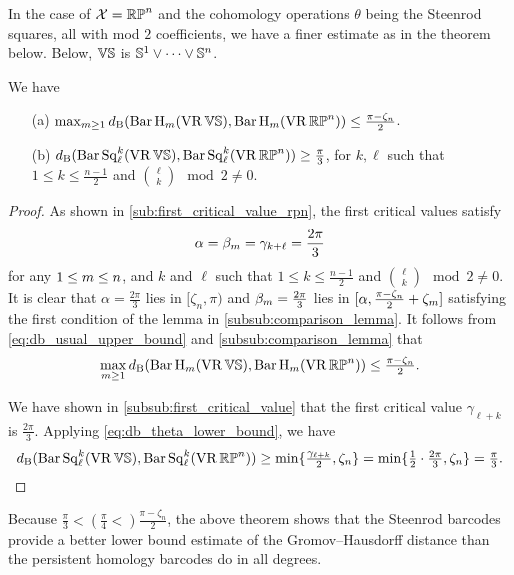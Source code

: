 \subsubsection{}

In the case of $\mathcal{X} = \mathbb{RP}^n$ and the cohomology operations $\theta$ being the Steenrod squares, all with mod $2$ coefficients, we have a finer estimate as in the theorem below.
Below, $\mathbb{V}\mathbb{S}$ is $\mathbb{S}^1\vee\dots\vee \mathbb{S}^n$.

\medskip\theorem
We have
\begin{itemize}
	\item[(a)] $\max_{m\geq 1}d_{\mathrm{B}}(\operatorname{Bar} \operatorname{H}_{m}(\operatorname{VR} \mathbb{V}\mathbb{S}), \operatorname{Bar} \operatorname{H}_{m}(\operatorname{VR} \mathbb{RP}^n))\leq \tfrac{\pi - \zeta_n}{2}$.
	\smallskip\item[(b)] $d_{\mathrm{B}}(\operatorname{Bar}\operatorname{Sq}^{k}_{\ell}(\operatorname{VR} \mathbb{V}\mathbb{S}), \operatorname{Bar}\operatorname{Sq}^{k}_{\ell}(\operatorname{VR} \mathbb{RP}^n))\geq \tfrac{\pi}{3}$, for $k,\ell$ such that $1\leq k \leq \frac{n-1}{2}$ and $\binom{\ell}{k} \mod 2 \neq 0$.
\end{itemize}

\begin{proof}
	As shown in \cref{sub:first_critical_value_rpn}, the first critical values satisfy
	$$
	\alpha = \beta_m = \gamma_{k+\ell} = \frac{2\pi}{3}
	$$
	for any $1 \leq m \leq n$, and $k$ and $\ell$ such that $1\leq k \leq \frac{n-1}{2}$ and $\binom{\ell}{k} \mod 2 \neq 0$.
	It is clear that $\alpha= \tfrac{2\pi}{3}$ lies in $[\zeta_n, \pi)$ and $\beta_m = \tfrac{2\pi}{3}$ lies in $[\alpha, \tfrac{\pi - \zeta_n}{2}+\zeta_m]$ satisfying the first condition of the lemma in \cref{subsub:comparison_lemma}.
	It follows from \cref{eq:db_usual_upper_bound} and \cref{subsub:comparison_lemma} that
	\[\max_{m\geq 1}d_{\mathrm{B}}(\operatorname{Bar} \operatorname{H}_{m}(\operatorname{VR} \mathbb{V}\mathbb{S}), \operatorname{Bar} \operatorname{H}_{m}(\operatorname{VR} \mathbb{RP}^n))\leq \tfrac{\pi - \zeta_n}{2}.\]

	We have shown in \cref{subsub:first_critical_value} that the first critical value $\gamma_{\ell+k}$ is $\tfrac{2\pi}{3}$.
	Applying \cref{eq:db_theta_lower_bound}, we have
	\[d_{\mathrm{B}}(\operatorname{Bar}\operatorname{Sq}^{k}_{\ell}(\operatorname{VR} \mathbb{V}\mathbb{S}), \operatorname{Bar}\operatorname{Sq}^{k}_{\ell}(\operatorname{VR} \mathbb{RP}^n))
	\geq \min\{\tfrac{\gamma_{\ell+k}}{2}, \zeta_n\}
	= \min\{\tfrac{1}{2}\cdot\tfrac{2\pi}{3}, \zeta_n\}
	= \tfrac{\pi}{3}.\]
\end{proof}

Because $\tfrac{\pi}{3} < (\tfrac{\pi}{4} <) \tfrac{\pi - \zeta_n}{2}$, the above theorem shows that the Steenrod barcodes provide a better lower bound estimate of the Gromov--Hausdorff distance than the persistent homology barcodes do in all degrees.